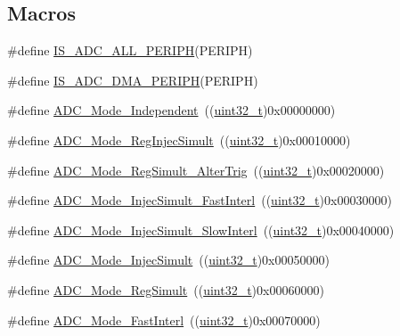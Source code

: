 \subsection*{Macros}
\begin{DoxyCompactItemize}
\item 
\#define \hyperlink{group___a_d_c___exported___constants_gaf5d6bd0153464912e0eaccb1af1aefb2}{I\+S\+\_\+\+A\+D\+C\+\_\+\+A\+L\+L\+\_\+\+P\+E\+R\+I\+PH}(P\+E\+R\+I\+PH)
\item 
\#define \hyperlink{group___a_d_c___exported___constants_ga56ce1703cee9a93969fc507b985ee949}{I\+S\+\_\+\+A\+D\+C\+\_\+\+D\+M\+A\+\_\+\+P\+E\+R\+I\+PH}(P\+E\+R\+I\+PH)
\item 
\#define \hyperlink{group___a_d_c__mode_ga2754d3a35559dc10e3d6a7d920e83432}{A\+D\+C\+\_\+\+Mode\+\_\+\+Independent}~((\hyperlink{_p_e___types_8h_a33594304e786b158f3fb30289278f5af}{uint32\+\_\+t})0x00000000)
\item 
\#define \hyperlink{group___a_d_c__mode_ga487d5f0c506291c5d37b53198396fd1c}{A\+D\+C\+\_\+\+Mode\+\_\+\+Reg\+Injec\+Simult}~((\hyperlink{_p_e___types_8h_a33594304e786b158f3fb30289278f5af}{uint32\+\_\+t})0x00010000)
\item 
\#define \hyperlink{group___a_d_c__mode_gae3d5fbf93f60d75534364bf9db78f632}{A\+D\+C\+\_\+\+Mode\+\_\+\+Reg\+Simult\+\_\+\+Alter\+Trig}~((\hyperlink{_p_e___types_8h_a33594304e786b158f3fb30289278f5af}{uint32\+\_\+t})0x00020000)
\item 
\#define \hyperlink{group___a_d_c__mode_ga2fc8a737f7b2375309bccbcb7fdbbfeb}{A\+D\+C\+\_\+\+Mode\+\_\+\+Injec\+Simult\+\_\+\+Fast\+Interl}~((\hyperlink{_p_e___types_8h_a33594304e786b158f3fb30289278f5af}{uint32\+\_\+t})0x00030000)
\item 
\#define \hyperlink{group___a_d_c__mode_gacb72230cb48a577907729d426be69c22}{A\+D\+C\+\_\+\+Mode\+\_\+\+Injec\+Simult\+\_\+\+Slow\+Interl}~((\hyperlink{_p_e___types_8h_a33594304e786b158f3fb30289278f5af}{uint32\+\_\+t})0x00040000)
\item 
\#define \hyperlink{group___a_d_c__mode_ga2339cc471aaf2db02daa4aeb49e9f0d9}{A\+D\+C\+\_\+\+Mode\+\_\+\+Injec\+Simult}~((\hyperlink{_p_e___types_8h_a33594304e786b158f3fb30289278f5af}{uint32\+\_\+t})0x00050000)
\item 
\#define \hyperlink{group___a_d_c__mode_ga71298f7453c2b4392a9c622328b3c93d}{A\+D\+C\+\_\+\+Mode\+\_\+\+Reg\+Simult}~((\hyperlink{_p_e___types_8h_a33594304e786b158f3fb30289278f5af}{uint32\+\_\+t})0x00060000)
\item 
\#define \hyperlink{group___a_d_c__mode_ga843ecdd53625e2088e91819e43106a7a}{A\+D\+C\+\_\+\+Mode\+\_\+\+Fast\+Interl}~((\hyperlink{_p_e___types_8h_a33594304e786b158f3fb30289278f5af}{uint32\+\_\+t})0x00070000)

\end{DoxyCompactItemize}
